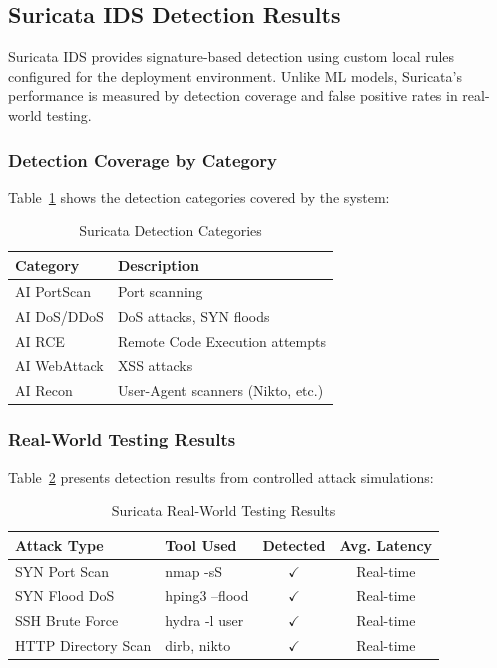 \documentclass[12pt,a4paper]{report} %
\begin{document}
\subsection{Suricata IDS Detection Results}
Suricata IDS provides signature-based detection using custom local rules configured for the deployment environment. Unlike ML models, Suricata's performance is measured by detection coverage and false positive rates in real-world testing.

\subsubsection{Detection Coverage by Category}
Table~\ref{tab:suricata-categories} shows the detection categories covered by the system:

\begin{table}[H]
	\centering
	\caption{Suricata Detection Categories}
	\label{tab:suricata-categories}
	\begin{tabular}{|l|l|}
		\hline
		\textbf{Category} & \textbf{Description} \\
		\hline
		AI PortScan & Port scanning \\
		AI DoS/DDoS & DoS attacks, SYN floods \\
		AI RCE & Remote Code Execution attempts \\
		AI WebAttack & XSS attacks \\
		AI Recon & User-Agent scanners (Nikto, etc.) \\
		\hline
	\end{tabular}
\end{table}

\subsubsection{Real-World Testing Results}
Table~\ref{tab:suricata-testing} presents detection results from controlled attack simulations:

\begin{table}[H]
	\centering
	\caption{Suricata Real-World Testing Results}
	\label{tab:suricata-testing}
	\begin{tabular}{|l|l|c|c|}
		\hline
		\textbf{Attack Type} & \textbf{Tool Used} & \textbf{Detected} & \textbf{Avg. Latency} \\
		\hline
		SYN Port Scan & nmap -sS & $\checkmark$ & Real-time \\
		SYN Flood DoS & hping3 --flood & $\checkmark$ & Real-time \\
		SSH Brute Force & hydra -l user & $\checkmark$ & Real-time \\
		HTTP Directory Scan & dirb, nikto & $\checkmark$ & Real-time \\
		\hline
	\end{tabular}
\end{table}
\end{document}
